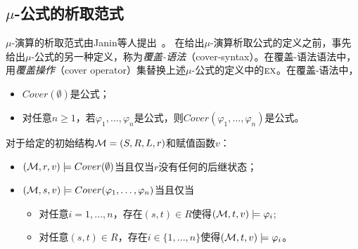 

\subsection{$\mu$-公式的析取范式}
$\mu$-演算的析取范式由Janin等人提出~\cite{janin1995automata,d2006modal}。%
在给出$\mu$-演算析取公式的定义之前，事先给出$\mu$-公式的另一种定义，称为\emph{覆盖-语法}（cover-syntax）。在覆盖-语法语法中，用\emph{覆盖操作}（cover operator）集替换上述$\mu$-公式的定义中的$\textsc{e}\textsc{x}$。在覆盖-语法中，
\begin{itemize}
	\item $Cover(\emptyset)$是公式；
	\item 对任意$n\geq 1$，若$\varphi_1,\dots, \varphi_n$是公式，则$Cover(\varphi_1, \dots, \varphi_n)$是公式。
\end{itemize}
对于给定的初始结构${\cal M}=(S,R,L,r)$和赋值函数$v$：
\begin{itemize}
	\item $({\cal M},r,v) \models Cover(\emptyset)$当且仅当$r$没有任何的后继状态；
	\item $({\cal M}, s,v ) \models Cover(\varphi_1, \dots, \varphi_n)$当且仅当
	\begin{itemize}
		\item 对任意$i = 1, . . . , n$，存在$(s, t) \in R$使得$({\cal M}, t,v) \models \varphi_i$;
		\item 对任意$(s, t) \in R$，存在$i\in \{1, . . . , n\}$使得$({\cal M}, t,v) \models \varphi_i$。
	\end{itemize}
\end{itemize}


